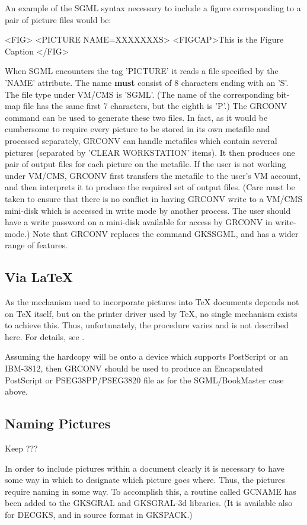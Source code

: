 An example of the SGML syntax necessary to include a figure corresponding
to a pair of picture files would be:
\begin{XMP}
<FIG>
<PICTURE NAME=XXXXXXXS>
<FIGCAP>This is the Figure Caption
</FIG>
\end{XMP}
When SGML encounters the tag 'PICTURE' it reads a file
specified by the 'NAME' attribute.
The name {\bf must} consist of 8 characters ending with an 'S'.
The file type under VM/CMS is 'SGML'. (The name of the corresponding
bit-map file has the same first 7 characters, but the eighth is 'P'.)
The GRCONV command can be used to generate these two files.
In fact, as it would be cumbersome to require every picture to be stored in
its own metafile and processed separately,
GRCONV can handle metafiles which contain several pictures (separated by
'CLEAR WORKSTATION' items). It then produces one pair of output files
for each picture on the metafile.
If the user is not working under VM/CMS, GRCONV first transfers the metafile to
the user's VM account, and then interprets it to produce the required
set of output files. (Care must be taken to ensure that there is no conflict
in having GRCONV write to a VM/CMS mini-disk which is accessed in
write mode by another process. The user should have a write password
on a mini-disk available for access by GRCONV in write-mode.)
Note that GRCONV replaces the command GKSSGML,
and has a wider range of features.
\subsection{Via \LaTeX}
 
As the mechanism used to incorporate pictures into TeX documents depends
not on TeX itself, but on the printer driver used by TeX, no single
mechanism exists to achieve this. Thus, unfortunately, the procedure
varies and is not described here. For details, see \cite{bib-TAC}.
 
Assuming the hardcopy will be onto a device which supports PostScript
or an IBM-3812, then GRCONV should be used to produce an Encapsulated PostScript
or PSEG38PP/PSEG3820 file as for the SGML/BookMaster case above.
\subsection{\protect\label{sec:gcnref}Naming Pictures}
\Lit{$==>$} Keep ???
 
In order to include pictures within a document clearly it is necessary to
have some way in which to designate which picture goes where.
Thus, the pictures require naming in some way.
To accomplish this, a routine called GCNAME has been added to the
GKSGRAL and GKSGRAL-3d libraries.
(It is available also for DECGKS, and in source format in GKSPACK.)
 
